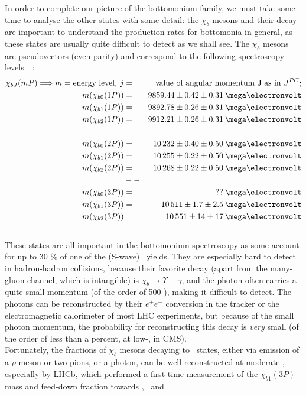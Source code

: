 In order to complete our picture of the bottomonium family, we must take some
time to analyse the other states with some detail:
the $\chi_{b}$ mesons and their decay are important to understand the
production rates for bottomonia in general, as these states are
usually quite difficult to detect as we shall see. The $\chi_{b}$
mesons are pseudovectors (even parity) and correspond to the following
spectroscopy levels~\cite{Agashe:2014kda}~\cite{chib3p_lhcb}:
\begin{eqnarray*}
\chi_{bJ}(mP) \Longrightarrow  m = \textrm{energy level},\: j &=&
\textrm{value of angular momentum J as in }J^{PC};\\
m(\chi_{b0}(1P)) &=& 9859.44 \pm 0.42 \pm 0.31\: \MeV\\
m(\chi_{b1}(1P)) &=& 9892.78 \pm 0.26 \pm 0.31\: \MeV\\
m(\chi_{b2}(1P)) &=& 9912.21 \pm 0.26 \pm 0.31\: \MeV\\
&--&\\
m(\chi_{b0}(2P)) &=& 10\,232 \pm 0.40 \pm 0.50\: \MeV\\
m(\chi_{b1}(2P)) &=& 10\,255 \pm 0.22 \pm 0.50\: \MeV\\
m(\chi_{b2}(2P)) &=& 10\,268 \pm 0.22 \pm 0.50\: \MeV\\
&--&\\
m(\chi_{b0}(3P)) &=& ??\: \MeV\\
m(\chi_{b1}(3P)) &=& 10\,511 \pm 1.7 \pm 2.5\: \MeV\\
m(\chi_{b2}(3P)) &=& 10\,551 \pm 14 \pm 17\: \MeV\\
\end{eqnarray*}
\\
These states are all important in the bottomonium spectroscopy as some
account for up to 30 \% of one of the (S-wave) \PgU~yields. They are
especially hard to detect in hadron-hadron collisions, because their
favorite decay (apart from the many-gluon channel, which is intangible) is
$\chi_{b} \to \Upsilon + \gamma$, and the photon often carries a quite
small momentum (of the order of 500 \MeV), making it difficult to
detect. The photons can be reconstructed by their $e^{+}e^{-}$
conversion in the tracker or the electromagnetic calorimeter of most
LHC experiments, but because of the small photon momentum, the probability
for reconstructing this decay is \textit{very} small (of the order of
less than a percent, at low-\pt, in CMS).
\\
Fortunately, the fractions of $\chi_{b}$ mesons decaying to
\PgU~states, either via emission of a $\rho$ meson or two pions, or a
photon, can be well reconstructed at moderate-\pt, especially by
LHCb, which performed a first-time measurement of
the $\chi_{b1}(3P)$ mass and feed-down fraction towards \PgUa, \PgUb\
and \PgUc~\cite{chib3p_lhcb}.


